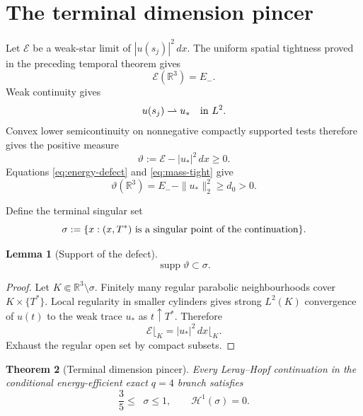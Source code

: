 \documentclass[11pt]{article}
\newtheorem{theorem}{Theorem}
\newtheorem{lemma}[theorem]{Lemma}
\theoremstyle{remark}
\newcommand{\R}{\mathbb R}
\newcommand{\HH}{\mathcal H}
\newcommand{\EE}{\mathcal E}
\newcommand{\weakto}{\rightharpoonup}
\DeclareMathOperator{\supp}{supp}
\DeclareMathOperator{\dimH}{dim_{\mathrm H}}
\begin{document}
\section{The terminal dimension pincer}

Let \(\EE\) be a weak-star limit of
\(|u(s_j)|^2\,dx\).  The uniform spatial tightness proved in the
preceding temporal theorem gives
\begin{equation}
 \label{eq:mass-tight}
 \EE(\R^3)=E_-.
\end{equation}
Weak continuity gives
\begin{equation}
 \label{eq:weak-terminal}
 u(s_j)\weakto u_*
 \quad\hbox{in }L^2.
\end{equation}
Convex lower semicontinuity on nonnegative compactly supported tests
therefore gives the positive measure
\begin{equation}
 \label{eq:defect-measure}
 \vartheta:=\EE-|u_*|^2\,dx\geq0.
\end{equation}
Equations \eqref{eq:energy-defect} and \eqref{eq:mass-tight} give
\begin{equation}
 \label{eq:defect-mass}
 \vartheta(\R^3)
 =
 E_--\|u_*\|_2^2
 \geq d_0>0.
\end{equation}

Define the terminal singular set
\[
 \sigma
 :=
 \{x:(x,T^*)\hbox{ is a singular point of the continuation}\}.
\]

\begin{lemma}[Support of the defect]
\label{lem:support}
\[
 \supp\vartheta\subset\sigma.
\]
\end{lemma}

\begin{proof}
Let \(K\Subset\R^3\setminus\sigma\).  Finitely many regular
parabolic neighbourhoods cover \(K\times\{T^*\}\).  Local regularity
in smaller cylinders gives strong \(L^2(K)\) convergence of \(u(t)\)
to the weak trace \(u_*\) as \(t\uparrow T^*\).  Therefore
\[
 \EE\lfloor_K=|u_*|^2\,dx\lfloor_K.
\]
Exhaust the regular open set by compact subsets.
\end{proof}

\begin{theorem}[Terminal dimension pincer]
\label{thm:pincer}
Every Leray--Hopf continuation in the conditional energy-efficient
exact \(q=4\) branch satisfies
\begin{equation}
 \label{eq:pincer}
 \boxed{
 \frac35\leq\dimH\sigma\leq1,
 \qquad
 \HH^1(\sigma)=0.
 }
\end{equation}
\end{theorem}
\end{document}
